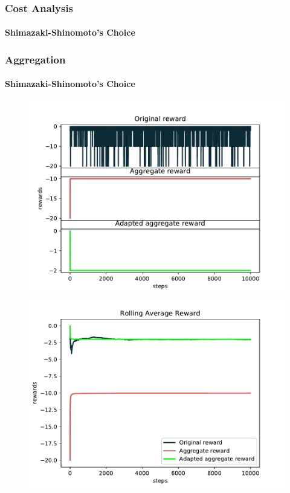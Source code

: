 \documentclass[mathserif]{beamer}
\begin{document}
    \begin{frame}
        \frametitle{Cost Analysis}
        \framesubtitle{Shimazaki-Shinomoto's Choice}

        \begin{figure}
            \label{fig:shimazaki-cost-histogram}
            \centering
            \qquad
        \end{figure}

    \end{frame}


    \begin{frame}
        \frametitle{Aggregation}
        \framesubtitle{Shimazaki-Shinomoto's Choice}

        \begin{figure}
            \label{fig:shimazaki-rewards}
            \centering
            \includegraphics[width=0.46\columnwidth]{res/experiments/shimazaki-shinomoto_steps_rewards.pdf}
            \qquad
            \includegraphics[width=0.46\columnwidth]{res/experiments/shimazaki-shinomoto_rolling_rewards.pdf}
        \end{figure}

    \end{frame}
\end{document}
